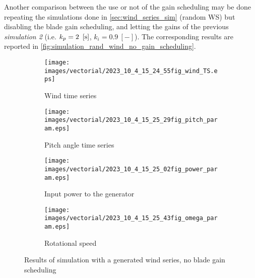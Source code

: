 Another comparison between the use or not of the gain scheduling may be done repeating the simulations done in \autoref{sec:wind_series_sim} (random WS) but disabling the blade gain scheduling, and letting the gains of the previous \textit{simulation 2} (i.e. $k_p = 2 \ \left[\si{\second}\right]$, $k_i=0.9 \ [-]$). The corresponding results are reported in \autoref{fig:simulation_rand_wind_no_gain_scheduling}.
\begin{figure}[htb]
  \begin{subfigure}{0.5\columnwidth}
    \centering
    \texttt{[image: images/vectorial/2023\_10\_4\_15\_24\_55fig\_wind\_TS.eps]}
    \caption{Wind time series}
    \label{fig:2023_05_8_22_43_35fig_wind_TS.eps}
  \end{subfigure}
  \begin{subfigure}{0.5\columnwidth}
    \centering
    \texttt{[image: images/vectorial/2023\_10\_4\_15\_25\_29fig\_pitch\_param.eps]}
    \caption{Pitch angle time series}
    \label{fig:2023_05_8_22_44_05fig_pitch_param}
  \end{subfigure}
  \begin{subfigure}{0.5\columnwidth}
    \centering
    \texttt{[image: images/vectorial/2023\_10\_4\_15\_25\_02fig\_power\_param.eps]}
    \caption{Input power to the generator}
    \label{fig:2023_05_8_22_44_15fig_power_param}
  \end{subfigure}
  \begin{subfigure}{0.5\columnwidth}
    \centering
    \texttt{[image: images/vectorial/2023\_10\_4\_15\_25\_43fig\_omega\_param.eps]}
    \caption{Rotational speed}
    \label{fig:2023_05_8_23_17_57fig_omega_param}
  \end{subfigure}
  \caption{Results of simulation with a generated wind series, no blade gain scheduling}
  \label{fig:simulation_rand_wind_no_gain_scheduling}
\end{figure}


